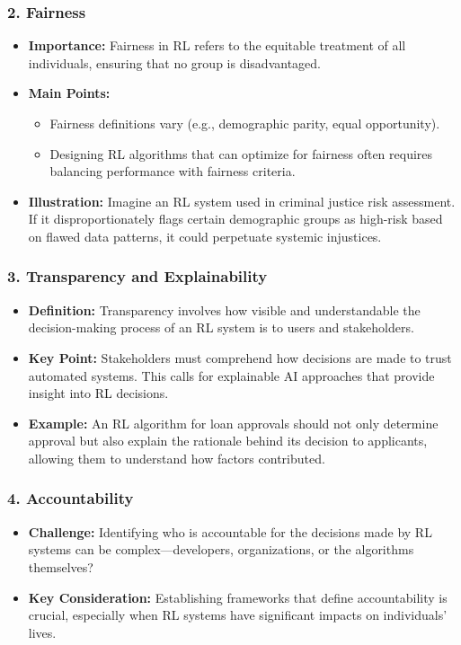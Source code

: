 \documentclass{beamer}
\begin{document}
\begin{frame}[fragile]
    \frametitle{2. Fairness}
    \begin{itemize}
        \item \textbf{Importance:} Fairness in RL refers to the equitable treatment of all individuals, ensuring that no group is disadvantaged.
        \item \textbf{Main Points:}
        \begin{itemize}
            \item Fairness definitions vary (e.g., demographic parity, equal opportunity).
            \item Designing RL algorithms that can optimize for fairness often requires balancing performance with fairness criteria.
        \end{itemize}
        \item \textbf{Illustration:} Imagine an RL system used in criminal justice risk assessment. If it disproportionately flags certain demographic groups as high-risk based on flawed data patterns, it could perpetuate systemic injustices.
    \end{itemize}
\end{frame}

\begin{frame}[fragile]
    \frametitle{3. Transparency and Explainability}
    \begin{itemize}
        \item \textbf{Definition:} Transparency involves how visible and understandable the decision-making process of an RL system is to users and stakeholders.
        \item \textbf{Key Point:} Stakeholders must comprehend how decisions are made to trust automated systems. This calls for explainable AI approaches that provide insight into RL decisions.
        \item \textbf{Example:} An RL algorithm for loan approvals should not only determine approval but also explain the rationale behind its decision to applicants, allowing them to understand how factors contributed.
    \end{itemize}
\end{frame}

\begin{frame}[fragile]
    \frametitle{4. Accountability}
    \begin{itemize}
        \item \textbf{Challenge:} Identifying who is accountable for the decisions made by RL systems can be complex—developers, organizations, or the algorithms themselves?
        \item \textbf{Key Consideration:} Establishing frameworks that define accountability is crucial, especially when RL systems have significant impacts on individuals’ lives.
    \end{itemize}
\end{frame}
\end{document}
